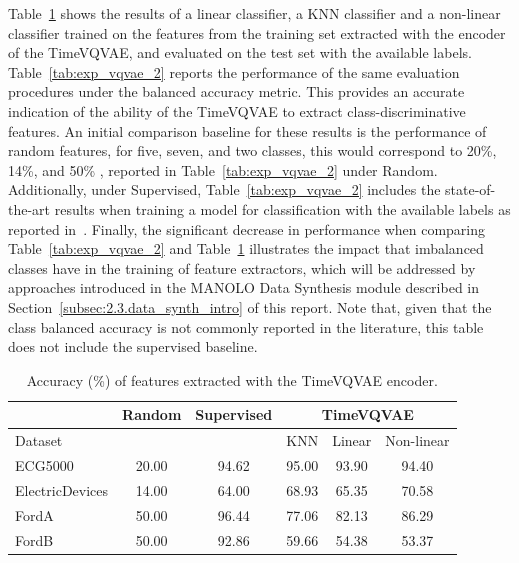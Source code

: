 Table~\ref{tab:exp_vqvae_1} shows the results of a linear classifier, a KNN classifier and a non-linear classifier trained on the features from the training set extracted with the encoder of the TimeVQVAE, and evaluated on the test set with the available labels. Table~\ref{tab:exp_vqvae_2} reports the performance of the same evaluation procedures under the balanced accuracy metric. This provides an accurate indication of the ability of the TimeVQVAE to extract class-discriminative features. An initial comparison baseline for these results is the performance of random features, for five, seven, and two classes, this would correspond to 20\%, 14\%, and 50\% , reported in Table~\ref{tab:exp_vqvae_2} under Random. Additionally,  under Supervised, Table~\ref{tab:exp_vqvae_2} includes the state-of-the-art results when training a model for classification with the available labels as reported in~\cite{2021_ICML_voice2series, 2023_Springer_TSandXAI}. Finally, the significant decrease in performance when comparing Table~\ref{tab:exp_vqvae_2} and Table~\ref{tab:exp_vqvae_1} illustrates the impact that imbalanced classes have in the training of feature extractors, which will be addressed by approaches introduced in the MANOLO Data Synthesis module described in Section~\ref{subsec:2.3.data_synth_intro} of this report. Note that, given that the class balanced accuracy is not commonly reported in the literature, this table does not include the supervised baseline.


\begin{table}[h]
    \centering           
    \caption{\label{tab:exp_vqvae_1} Accuracy (\%) of features extracted with the TimeVQVAE encoder.}
    \begin{tabular}{lccccc}
        \hline 
        { } & {Random} & {Supervised} & \multicolumn{3}{c}{TimeVQVAE} \tabularnewline
        \hline 
        {Dataset} & {} & {} & \multicolumn{1}{|c}{KNN} & {Linear} & \multicolumn{1}{c}{Non-linear} \tabularnewline
         \hline
        ECG5000 & {20.00} & {94.62} & 95.00 &  93.90  &  94.40 \tabularnewline
        ElectricDevices & {14.00} & {64.00} & 68.93 &  65.35  & 70.58 \tabularnewline
        FordA & {50.00} & {96.44} & 77.06 & 82.13 & 86.29 \tabularnewline
        FordB & {50.00} & {92.86} & 59.66 & 54.38 & 53.37 \tabularnewline
        \hline
    \end{tabular} 
\end{table}


